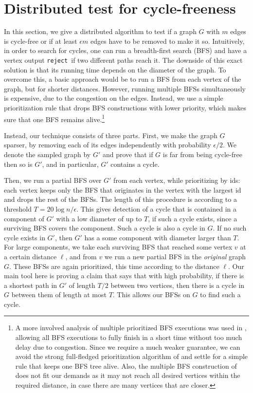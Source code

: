 \documentclass[11pt]{article}
\newcommand{\reject}{\texttt{reject}}
\begin{document}
\section{Distributed test for cycle-freeness}
\label{sec:cycle}
In this section, we give a distributed algorithm to test if a graph $G$ with $m$ edges is cycle-free
or if at least $\epsilon m$ edges have to be removed to make it so. Intuitively, in order to search for cycles, one can run a breadth-first search (BFS) and have a vertex output \reject~if two different paths reach it. The downside of this exact solution is that its running time depends on the diameter of the graph. To overcome this, a basic approach would be to run a BFS from each vertex of the graph, but for shorter distances. However, running multiple BFSs simultaneously is expensive, due to the congestion on the edges. Instead, we use a simple prioritization rule that drops BFS constructions with lower priority, which makes sure that one BFS remains alive.\footnote{A more involved analysis of multiple prioritized BFS executions was used in \cite{Holzer2012}, allowing all BFS executions to fully finish in a short time without too much delay due to congestion. Since we require a much weaker guarantee, we can avoid the strong full-fledged prioritization algorithm of \cite{Holzer2012} and settle for a simple rule that keeps one BFS tree alive. Also, the multiple BFS construction of \cite{LenzenP13} does not fit our demands as it may not reach all desired vertices within the required distance, in case there are many vertices that are closer.}

Instead, our technique consists of three parts. First, we make the graph $G$ sparser, by removing each of its edges independently with probability $\epsilon/2$. We denote the sampled graph by $G'$ and prove that if $G$ is far from being cycle-free then so is $G'$, and in particular, $G'$ contains a cycle.

Then, we run a partial BFS over $G'$ from each vertex, while prioritizing by ids: each vertex keeps only the BFS that originates in the vertex with the largest id and drops the rest of the BFSs. The length of this procedure is according to a threshold $T=20\log{n}/\epsilon$. This gives detection of a cycle that is contained in a component of $G'$ with a low diameter of up to $T$, if such a cycle exists, since a surviving BFS covers the component. Such a cycle is also a cycle in $G$. If no such cycle exists in $G'$, then $G'$ has a some component with diameter larger than $T$. For large components, we take each surviving BFS that reached some vertex $v$ at a certain distance $\ell$, and from $v$ we run a new partial BFS in the \emph{original} graph $G$. These BFSs are again prioritized, this time according to the distance $\ell$. Our main tool here is proving a claim that says that with high probability, if there is a shortest path in $G'$ of length $T/2$ between two vertices, then there is a cycle in $G$ between them of length at most $T$. This allows our BFSs on $G$ to find such a cycle.
\end{document}
